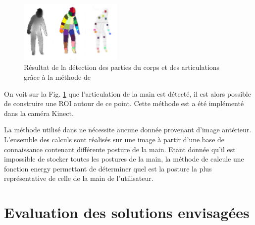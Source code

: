 \begin{figure}[!h]
 \begin{center}
  \includegraphics[width=5cm]{images/bodyrecognition.png}
  \caption{Résultat de la détection des parties du corps et des articulations grâce à la méthode de \cite{export:145347}}
  \label{fig:bodyrecognition}
 \end{center}
\end{figure}

On voit sur la Fig. \ref{fig:bodyrecognition} que l'articulation de la main est détecté, il est alors possible de construire
une ROI autour de ce point. Cette méthode est a été implémenté dans la caméra Kinect.

La méthode utilisé dans \cite{export:238453} ne nécessite aucune donnée provenant d'image antérieur. L'ensemble
des calculs sont réalisés sur une image à partir d'une base de connaissance contenant différente posture de la
main. Etant donnée qu'il est impossible de stocker toutes les postures de la main, la méthode de \cite{export:238453}
calcule une fonction energy permettant de déterminer quel est la posture la plus représentative de celle de la main
de l'utilisateur.

\section{Evaluation des solutions envisagées}
